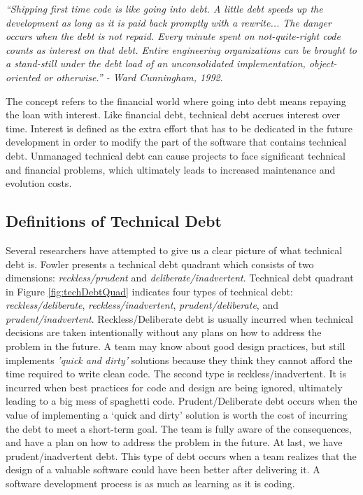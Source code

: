 \begin{displayquote}
	\textit{“Shipping first time code is like going into debt. A little debt speeds up the development as long as it is paid back promptly with a rewrite... The danger occurs when the debt is not repaid. Every minute spent on not-quite-right code counts as interest on that debt. Entire engineering organizations can be brought to a stand-still under the debt load of an unconsolidated implementation, object-oriented or otherwise.” - Ward Cunningham, 1992}.
\end{displayquote}

The concept refers to the financial world where going into debt means repaying the loan with interest\cite{p50-allman}. Like financial debt, technical debt accrues interest over time. Interest is defined as the extra effort that has to be dedicated in the future development in order to modify the part of the software that contains technical debt\cite{p31-guo,p35-klinger,li2015systematic}. Unmanaged technical debt can cause projects to face significant technical and financial problems, which ultimately leads to increased maintenance and evolution costs\cite{nord2012search}. 



\subsection{Definitions of Technical Debt}
Several researchers have attempted to give us a clear picture of what technical debt is\cite{url-fowler,url-mcconnell,krutchen}. Fowler\cite{url-fowler} presents a technical debt quadrant which consists of two dimensions: \textit{reckless/prudent} and \textit{deliberate/inadvertent}\cite{url-fowler}. Technical debt quadrant in Figure \ref{fig:techDebtQuad} indicates four types of technical debt: \textit{reckless/deliberate}, \textit{reckless/inadvertent}, \textit{prudent/deliberate}, and \textit{prudent/inadvertent}. Reckless/Deliberate debt is usually incurred when technical decisions are taken intentionally without any plans on how to address the problem in the future. A team may know about good design practices, but still implements \textit{'quick and dirty'} solutions because they think they cannot afford the time required to write clean code. The second type is reckless/inadvertent. It is incurred when best practices for code and design are being ignored, ultimately leading to a big mess of spaghetti code. Prudent/Deliberate debt occurs when the value of implementing a ‘quick and dirty’ solution is worth the cost of incurring the debt to meet a short-term goal. The team is fully aware of the consequences, and have a plan on how to address the problem in the future. At last, we have prudent/inadvertent debt. This type of debt occurs when a team realizes that the design of a valuable software could have been better after delivering it. A software development process is as much as learning as it is coding.

